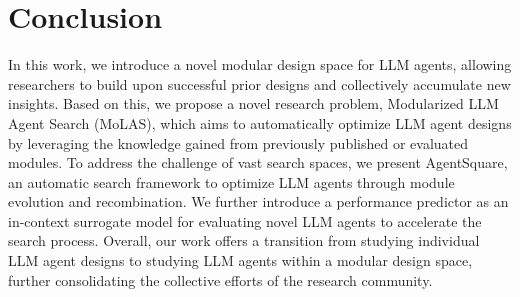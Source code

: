 \documentclass{article} %
\begin{document}
\section{Conclusion}
In this work, we introduce a novel modular design space for LLM agents, allowing researchers to build upon successful prior designs and collectively accumulate new insights. 
Based on this, we propose a novel research problem, Modularized LLM Agent Search (MoLAS), which aims to automatically optimize LLM agent designs by leveraging the knowledge gained from previously published or evaluated modules.
To address the challenge of vast search spaces, we present AgentSquare, an automatic search framework to optimize LLM agents through module evolution and recombination.
We further introduce a performance predictor as an in-context surrogate model for evaluating novel LLM agents to accelerate the search process.
Overall, our work offers a transition from studying individual LLM agent designs to studying LLM agents within a modular design space, further consolidating the collective efforts of the research community.
\clearpage






\appendix

\end{document}
